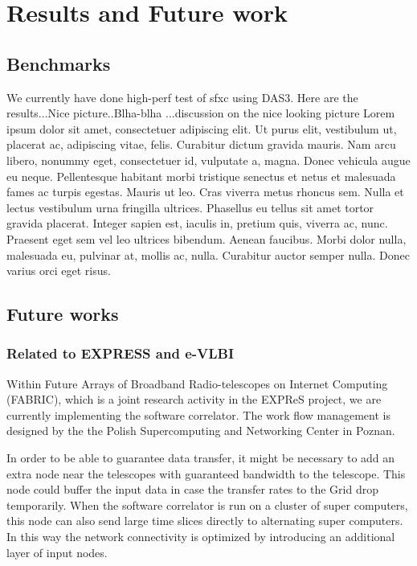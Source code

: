 \section{Results and Future work}\label{sec:results}
\subsection{Benchmarks}
We currently have done high-perf test of sfxc using DAS3. Here are 
the results...Nice picture..Blha-blha ...discussion on the nice looking picture
Lorem ipsum dolor sit amet, consectetuer
adipiscing elit. Ut purus elit, vestibulum ut, placerat ac,
adipiscing vitae, felis. Curabitur dictum gravida mauris. Nam arcu
libero, nonummy eget, consectetuer id, vulputate a, magna. Donec
vehicula augue eu neque. Pellentesque habitant morbi tristique
senectus et netus et malesuada fames ac turpis egestas. Mauris ut
leo. Cras viverra metus rhoncus sem. Nulla et lectus vestibulum urna
fringilla ultrices. Phasellus eu tellus sit amet tortor gravida
placerat. Integer sapien est, iaculis in, pretium quis, viverra ac,
nunc. Praesent eget sem vel leo ultrices bibendum. Aenean faucibus.
Morbi dolor nulla, malesuada eu, pulvinar at, mollis ac, nulla.
Curabitur auctor semper nulla. Donec varius orci eget risus. 

\subsection{Future works}

\subsubsection{Related to EXPRESS and e-VLBI}
Within Future Arrays of Broadband Radio-telescopes on Internet
Computing (FABRIC), which is a joint research activity in the EXPReS
project, we are currently implementing the software correlator. The
work flow management is designed by the the Polish Supercomputing and
Networking Center in Poznan.

In order to be able to guarantee data transfer, it might be necessary
to add an extra node near the telescopes with guaranteed bandwidth to
the telescope. This node could buffer the input data in case the
transfer rates to the Grid drop temporarily. When the software
correlator is run on a cluster of super computers, this node can also
send large time slices directly to alternating super computers. In
this way the network connectivity is optimized by introducing an
additional layer of input nodes.

